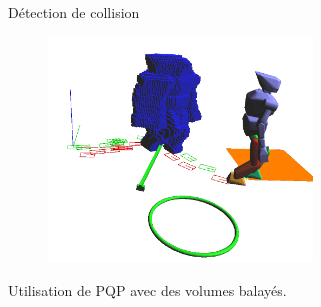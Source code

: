 \documentclass{beamer}
\begin{document}
\begin{frame}
  \begin{center}
    Détection de collision
    \begin{figure}
      \includegraphics[width=7cm]{./images/SV.png}
    \end{figure}
    Utilisation de PQP avec des volumes balayés.
  \end{center}
\end{frame}
\end{document}
